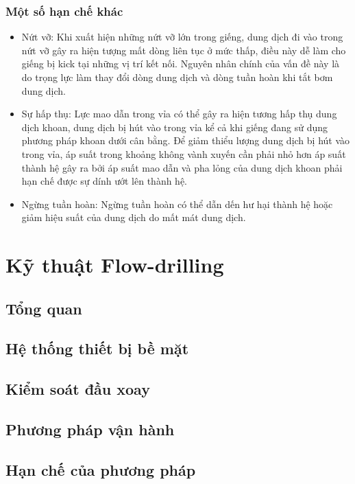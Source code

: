 \documentclass[13pt,a4paper]{article}
\begin{document}
	\subsubsection{Một số hạn chế khác}
		\begin{itemize}
			\item Nứt vỡ: Khi xuất hiện những nứt vỡ lớn trong giếng, dung dịch đi vào trong nứt vỡ gây ra hiện tượng mất dòng liên tục ở mức thấp, điều này dễ làm cho giếng bị kick tại những vị trí kết nối. Nguyên nhân chính của vấn đề này là do trọng lực làm thay đổi dòng dung dịch và dòng tuần hoàn khi tắt bơm dung dịch.
			\item Sự hấp thụ: Lực mao dẫn trong vỉa có thể gây ra hiện tương hấp thụ dung dịch khoan, dung dịch bị hút vào trong vỉa kể cả khi giếng đang sử dụng phương pháp khoan dưới cân bằng. Để giảm thiểu lượng dung dịch bị hút vào trong vỉa, áp suất trong khoảng không vành xuyến cần phải nhỏ hơn áp suất thành hệ gây ra bởi áp suất mao dẫn và pha lỏng của dung dịch khoan phải hạn chế được sự dính ướt lên thành hệ.
			\item Ngừng tuần hoàn: Ngừng tuần hoàn có thể dẫn dến hư hại thành hệ hoặc giảm hiệu suất của dung dịch do mất mát dung dịch.
		\end{itemize}
\section{Kỹ thuật Flow-drilling}
\subsection{Tổng quan}
\subsection{Hệ thống thiết bị bề mặt}
\subsection{Kiểm soát đầu xoay}
\subsection{Phương pháp vận hành}
\subsection{Hạn chế của phương pháp}
\end{document}
